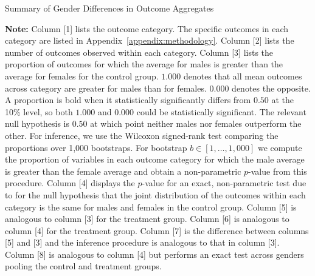 \begin{sidewaystable}[H]
\centering
\footnotesize
\begin{threeparttable}
\caption{Summary of Gender Differences in Outcome Aggregates} \label{table:summary}
 \label{tab:proportion-table-ranksign}
 
 \begin{tablenotes}
 \footnotesize
\item \textbf{Note:} Column [1] lists the outcome category. The specific outcomes in each category are listed in Appendix~\ref{appendix:methodology}. Column [2] lists the number of outcomes observed within each category. Column [3] lists the proportion of outcomes for which the average for males is greater than the average for females for the control group. $1.000$ denotes that all mean outcomes across category are greater for males than for females. $0.000$ denotes the opposite. A proportion is bold when it statistically significantly differs from $0.50$ at the 10\% level, so both $1.000$ and $0.000$ could be statistically significant. The relevant null hypothesis is $0.50$ at which point neither males nor females outperform the other. For inference, we use the Wilcoxon signed-rank test comparing the proportions over 1,000 bootstraps. For bootstrap $b \in [1, \ldots, 1,000]$ we compute the proportion of variables in each outcome category for which the male average is greater than the female average and obtain a non-parametric $p$-value from this procedure. Column [4] displays the $p$-value for an exact, non-parametric test due to \cite{Rosenbaum_2005_Distribution_JRSS} for the null hypothesis that the joint distribution of the outcomes within each category is the same for males and females in the control group. Column [5] is analogous to column [3] for the treatment group. Column [6] is analogous to column [4] for the treatment group. Column [7] is the difference between columns [5] and [3] and the inference procedure is analogous to that in column [3]. Column [8] is analogous to column [4] but performs an exact test across genders pooling the control and treatment groups.
\end{tablenotes}
\end{threeparttable}
\end{sidewaystable}

